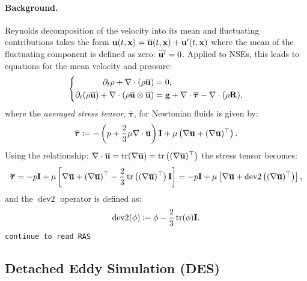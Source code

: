 \documentclass{article}
\numberwithin{equation}{section}
\begin{document}
\paragraph{Background.} Reynolds decomposition of the velocity into its mean and fluctuating contributions takes the form ${\bf u}(t,{\bf x}) = \overline{\bf u}(t,{\bf x}) + {\bf u}'(t,{\bf x})$ where the mean of the fluctuating component is defined as zero: $\overline{{\bf u}'} = 0$. Applied to NSEs, this leads to equations for the mean velocity and pressure:
\begin{equation*}
	\left\{\begin{split}
		\partial_t\rho + \nabla\cdot(\rho\overline{\bf u}) &= 0,\\
		\partial_t(\rho\overline{\bf u}) + \nabla\cdot(\rho\overline{\bf u}\otimes\overline{\bf u}) &= {\bf g} + \nabla\cdot\overline{\boldsymbol{\tau}} - \nabla\cdot(\rho{\bf R}),
	\end{split}\right.
\end{equation*}
where the \textit{averaged stress tensor}, $\overline{\boldsymbol{\tau}}$, for Newtonian fluids is given by:
\begin{align*}
	\overline{\boldsymbol{\tau}}\coloneqq-\left(p + \frac{2}{3}\mu\nabla\cdot\overline{\bf u}\right){\bf I} + \mu\left(\nabla\overline{\bf u} + (\nabla\overline{\bf u})^\top\right).
\end{align*}
Using the relationship: $\nabla\cdot\overline{\bf u} = \operatorname{tr}(\nabla\overline{\bf u}) = \operatorname{tr}\left((\nabla\overline{\bf u})^\top\right)$ the stress tensor becomes:
\begin{align*}
	\overline{\boldsymbol{\tau}} = -p{\bf I} + \mu\left[\nabla\overline{\bf u} + (\nabla\overline{\bf u})^\top - \frac{2}{3}\operatorname{tr}\left((\nabla\overline{\bf u})^\top\right){\bf I}\right] = -p{\bf I} + \mu\left[\nabla\overline{\bf u} + \operatorname{dev2}\left((\nabla\overline{\bf u})^\top\right)\right],
\end{align*}
and the $\operatorname{dev2}$ operator is defined as:
\begin{align*}
	\operatorname{dev2}(\phi)\coloneqq\phi - \frac{2}{3}\operatorname{tr}(\phi){\bf I}.
\end{align*}
\texttt{continue to read RAS}

\subsection{Detached Eddy Simulation (DES)}
\end{document}
